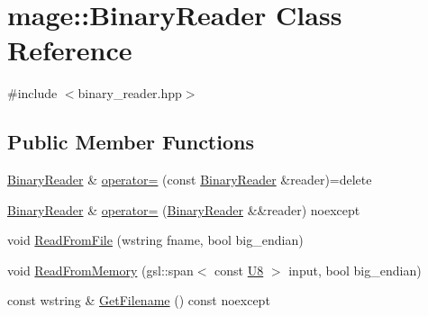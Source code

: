 \hypertarget{classmage_1_1_binary_reader}{}\section{mage\+:\+:Binary\+Reader Class Reference}
\label{classmage_1_1_binary_reader}


{\ttfamily \#include $<$binary\+\_\+reader.\+hpp$>$}

\subsection*{Public Member Functions}
\begin{DoxyCompactItemize}
\item 
\mbox{\hyperlink{classmage_1_1_binary_reader}{Binary\+Reader}} \& \mbox{\hyperlink{classmage_1_1_binary_reader_a0408bb456983b4a03ae42ab69c6f4bc3}{operator=}} (const \mbox{\hyperlink{classmage_1_1_binary_reader}{Binary\+Reader}} \&reader)=delete
\item 
\mbox{\hyperlink{classmage_1_1_binary_reader}{Binary\+Reader}} \& \mbox{\hyperlink{classmage_1_1_binary_reader_a280998bb89dacdcb88ec87c49ce90a02}{operator=}} (\mbox{\hyperlink{classmage_1_1_binary_reader}{Binary\+Reader}} \&\&reader) noexcept
\item 
void \mbox{\hyperlink{classmage_1_1_binary_reader_ad302abb7498cce11c0982d98973817de}{Read\+From\+File}} (wstring fname, bool big\+\_\+endian)
\item 
void \mbox{\hyperlink{classmage_1_1_binary_reader_a093d95a36bdc45f5d51f48f1ee09bb1f}{Read\+From\+Memory}} (gsl\+::span$<$ const \mbox{\hyperlink{namespacemage_afc638980bc6154f15af5e2d93a0e0ea9}{U8}} $>$ input, bool big\+\_\+endian)
\item 
const wstring \& \mbox{\hyperlink{classmage_1_1_binary_reader_ad9d4a4a3e2f0afc666d15badff08fe4a}{Get\+Filename}} () const noexcept
\end{DoxyCompactItemize}
